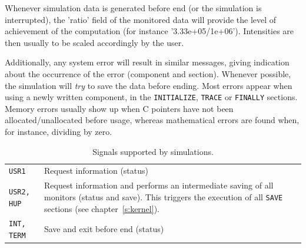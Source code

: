 Whenever simulation data is generated before end (or the simulation is
interrupted), the 'ratio' field of the monitored data will provide the level of
achievement of the computation (for instance '3.33e+05/1e+06'). Intensities are
then usually to be scaled accordingly by the user.

Additionally, any system error will result in similar messages, giving
indication about the occurrence of the error (component and section). Whenever
possible, the simulation will {\em try} to save the data before ending. Most
errors appear when using a newly written component, in the \texttt{INITIALIZE},
\texttt{TRACE} or \texttt{FINALLY} sections. Memory errors usually show up when
C pointers have not been allocated/unallocated before usage, whereas
mathematical errors are found when, for instance, dividing by zero.

\begin{table}
  \begin{center}
    {\let\my=\\
    \begin{tabular}{|p{}|p{}|}
      \hline
      \texttt{USR1} & Request information (status)  \\
      \texttt{USR2, HUP} & Request information and performs an intermediate
      saving of all monitors (status and save). This triggers the execution of
      all \texttt{SAVE} sections (see chapter~\ref{s:kernel}).  \\
      \texttt{INT, TERM} & Save and exit before end (status)  \\
      \hline
    \end{tabular}
    \caption{Signals supported by \MCS simulations.}
    \label{t:signals}
    }
  \end{center}
\end{table}

